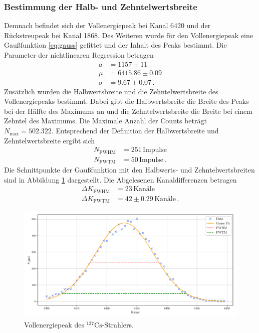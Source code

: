 \subsubsection{Bestimmung der Halb- und Zehntelwertsbreite}
Demnach befindet sich der Vollenergiepeak bei Kanal 6420 und der Rückstreupeak bei Kanal 1868.
Des Weiteren wurde für den Vollenergiepeak eine Gaußfunktion \ref{eq:gauss} gefittet und der Inhalt des Peaks bestimmt.
Die Parameter der nichtlinearen Regression betragen
\begin{align*}
  a &= 1157 \pm 11 \\
  \mu &= 6415.86 \pm 0.09 \\
  \sigma &= 9.67 \pm 0.07 \, .
\end{align*}
Zusätzlich wurden die Halbwertsbreite und die Zehntelwertsbreite des Vollenergiepeaks bestimmt.
Dabei gibt die Halbwertsbreite die Breite des Peaks bei der Hälfte des Maximums an und die Zehntelwertsbreite die Breite bei einem Zehntel des Maximums.
Die Maximale Anzahl der Counts beträgt $N_\text{max} = 502.322$.
Entsprechend der Definition der Halbwertsbreite und Zehntelwertsbreite ergibt sich
\begin{align*}
  N_\text{FWHM} &= 251 \, \text{Impulse} \\
  N_\text{FWTM} &= 50 \, \text{Impulse} \, .
\end{align*}
Die Schnittpunkte der Gaußfunktion mit den Halbwerts- und Zehntelwertsbreiten sind in Abbildung \ref{fig:photopeak} dargestellt.
Die Abgelesenen Kanaldifferenzen betragen
\begin{align*}
  \Delta K_\text{FWHM} &= 23 \, \text{Kanäle} \\
  \Delta K_\text{FWTM} &= 42 \pm 0.29 \, \text{Kanäle} \, .
\end{align*}
\begin{figure}[H]
  \centering
  \includegraphics[width=\textwidth]{../plots/Caesium-Peak-6420.pdf}
  \caption{Vollenergiepeak des $^{137}\text{Cs}$-Strahlers.}
  \label{fig:photopeak}
\end{figure}
